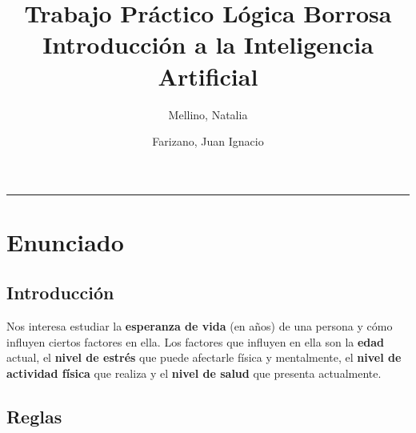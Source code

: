 \documentclass[11pt]{article}
\title{
    Trabajo Práctico Lógica Borrosa \\
    \large Introducción a la Inteligencia Artificial}
\author{Mellino, Natalia \and Farizano, Juan Ignacio}
\date{}
\begin{document}
\maketitle

\noindent\rule{\textwidth}{1pt}

\section{Enunciado}

\subsection*{Introducción}
Nos interesa estudiar la \textbf{esperanza de vida} (en años) de una persona y cómo
influyen ciertos factores en ella. Los factores que influyen en ella son la \textbf{edad} actual,
el \textbf{nivel de estrés} que puede afectarle física y mentalmente,
el \textbf{nivel de actividad física} que realiza y el \textbf{nivel de salud}
que presenta actualmente.

\subsection*{Reglas}
\end{document}
